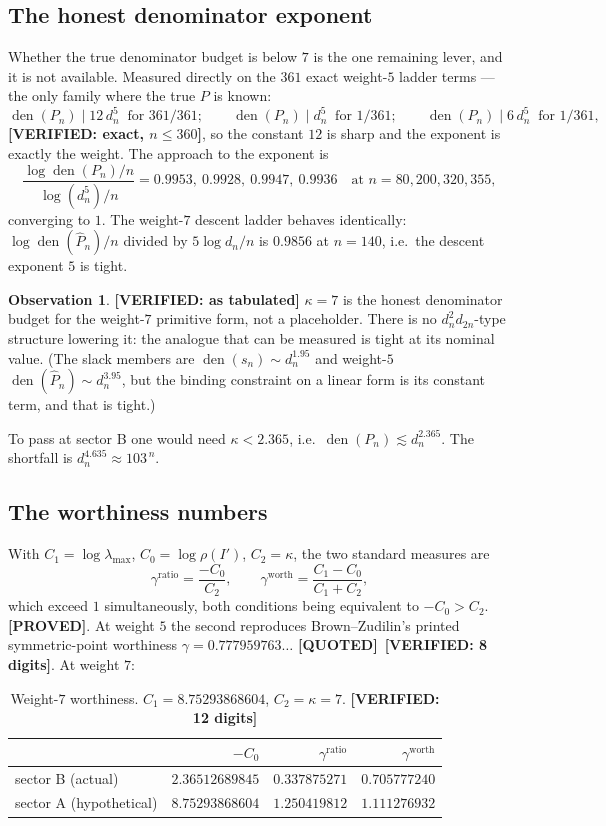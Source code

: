 \documentclass[11pt,reqno]{amsart}
\theoremstyle{plain}
\theoremstyle{definition}
\newtheorem{observation}[theorem]{Observation}
\theoremstyle{remark}
\newcommand{\PROVED}{{\normalfont\sffamily\bfseries[PROVED]}}
\newcommand{\VER}[1]{{\normalfont\sffamily\bfseries[VERIFIED: #1]}}
\newcommand{\QUOTEDMARK}{{\normalfont\sffamily\bfseries[QUOTED]}}
\newcommand{\QUOTED}[1]{\QUOTEDMARK\,#1}
\DeclareMathOperator{\den}{den}
\newcommand{\Phat}{\widehat{P}}
\begin{document}
\subsection{The honest denominator exponent}\label{sec:kappa7}
Whether the true denominator budget is below $7$ is the one remaining lever, and it is not
available. Measured directly on the $361$ exact weight-$5$ ladder terms --- the only family where
the true $P$ is known:
\[
  \den(P_n)\mid 12\,d_n^{5}\ \text{ for } 361/361;\qquad
  \den(P_n)\mid d_n^{5}\ \text{ for } 1/361;\qquad
  \den(P_n)\mid 6\,d_n^{5}\ \text{ for } 1/361,
\]
\VER{exact, $n\le360$}, so the constant $12$ is sharp and the exponent is exactly the weight.
The approach to the exponent is
\[
  \frac{\log\den(P_n)/n}{\log(d_n^5)/n}=0.9953,\ 0.9928,\ 0.9947,\ 0.9936
  \quad\text{at } n=80,200,320,355,
\]
converging to $1$. The weight-$7$ descent ladder behaves identically:
$\log\den(\Phat_n)/n$ divided by $5\log d_n/n$ is $0.9856$ at $n=140$, i.e.\ the descent exponent
$5$ is tight.

\begin{observation}\label{obs:kappa7} \VER{as tabulated}
$\kappa=7$ is the honest denominator budget for the weight-$7$ primitive form, not a placeholder.
There is no $d_n^2d_{2n}$-type structure lowering it: the analogue that can be measured is tight
at its nominal value. (The slack members are $\den(s_n)\sim d_n^{1.95}$ and weight-$5$
$\den(\Phat_n)\sim d_n^{3.95}$, but the binding constraint on a linear form is its constant term,
and that is tight.)
\end{observation}

To pass at sector B one would need $\kappa<2.365$, i.e.\ $\den(P_n)\lesssim d_n^{2.365}$. The
shortfall is $d_n^{4.635}\approx103^{\,n}$.

\subsection{The worthiness numbers}\label{sec:gamma}
With $C_1=\log\lambda_{\max}$, $C_0=\log\rho(I')$, $C_2=\kappa$, the two standard measures are
\[
  \gamma^{\mathrm{ratio}}=\frac{-C_0}{C_2},\qquad
  \gamma^{\mathrm{worth}}=\frac{C_1-C_0}{C_1+C_2},
\]
which exceed $1$ simultaneously, both conditions being equivalent to $-C_0>C_2$. \PROVED. At
weight $5$ the second reproduces Brown--Zudilin's printed symmetric-point worthiness
$\gamma=0.777959763\ldots$ \QUOTED{\cite[\S2]{BZ}} \VER{8 digits}. At weight $7$:

\begin{table}[h]
\centering
\caption{Weight-$7$ worthiness. $C_1=8.75293868604$, $C_2=\kappa=7$. \VER{12 digits}}
\label{tab:gamma}
\begin{tabular}{lrrr}
\toprule
 & $-C_0$ & $\gamma^{\mathrm{ratio}}$ & $\gamma^{\mathrm{worth}}$\\
\midrule
sector B (actual) & $2.36512689845$ & $0.337875271$ & $0.705777240$\\
sector A (hypothetical) & $8.75293868604$ & $1.250419812$ & $1.111276932$\\
\bottomrule
\end{tabular}
\end{table}
\end{document}
